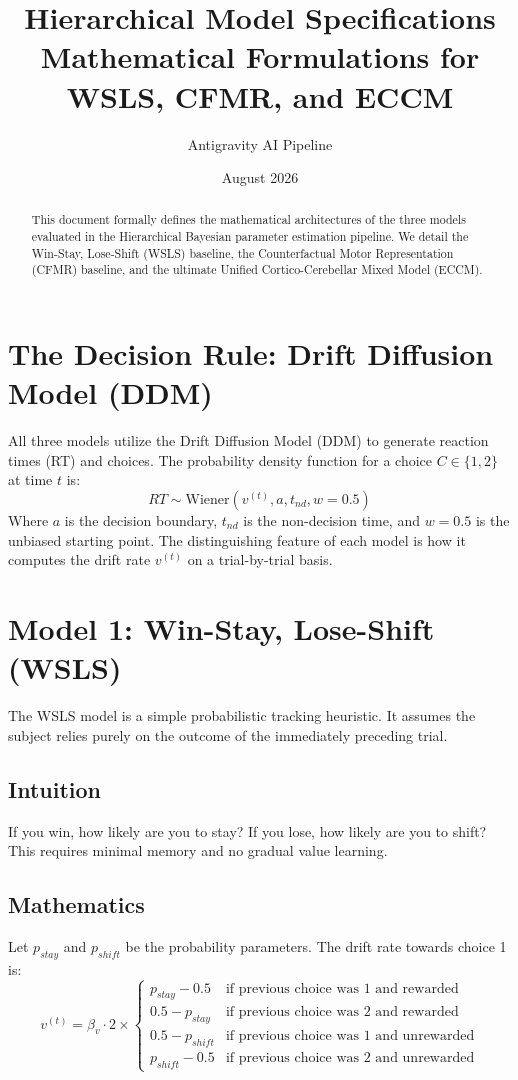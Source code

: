 \documentclass[11pt,a4paper]{article}
\title{\textbf{Hierarchical Model Specifications}\\ \Large Mathematical Formulations for WSLS, CFMR, and ECCM}
\author{Antigravity AI Pipeline}
\date{August 2026}
\begin{document}
\maketitle

\begin{abstract}
This document formally defines the mathematical architectures of the three models evaluated in the Hierarchical Bayesian parameter estimation pipeline. We detail the Win-Stay, Lose-Shift (WSLS) baseline, the Counterfactual Motor Representation (CFMR) baseline, and the ultimate Unified Cortico-Cerebellar Mixed Model (ECCM).
\end{abstract}

\section{The Decision Rule: Drift Diffusion Model (DDM)}
All three models utilize the Drift Diffusion Model (DDM) to generate reaction times (RT) and choices. The probability density function for a choice $C \in \{1, 2\}$ at time $t$ is:
\begin{equation}
    RT \sim \text{Wiener}(v^{(t)}, a, t_{nd}, w=0.5)
\end{equation}
Where $a$ is the decision boundary, $t_{nd}$ is the non-decision time, and $w=0.5$ is the unbiased starting point. The distinguishing feature of each model is how it computes the drift rate $v^{(t)}$ on a trial-by-trial basis.

\section{Model 1: Win-Stay, Lose-Shift (WSLS)}
The WSLS model is a simple probabilistic tracking heuristic. It assumes the subject relies purely on the outcome of the immediately preceding trial. 
\subsection{Intuition}
If you win, how likely are you to stay? If you lose, how likely are you to shift? This requires minimal memory and no gradual value learning.
\subsection{Mathematics}
Let $p_{stay}$ and $p_{shift}$ be the probability parameters. The drift rate towards choice 1 is:
\begin{equation}
v^{(t)} = \beta_v \cdot 2 \times \begin{cases}
    p_{stay} - 0.5 & \text{if previous choice was 1 and rewarded} \\
    0.5 - p_{stay} & \text{if previous choice was 2 and rewarded} \\
    0.5 - p_{shift} & \text{if previous choice was 1 and unrewarded} \\
    p_{shift} - 0.5 & \text{if previous choice was 2 and unrewarded}
\end{cases}
\end{equation}
\end{document}
